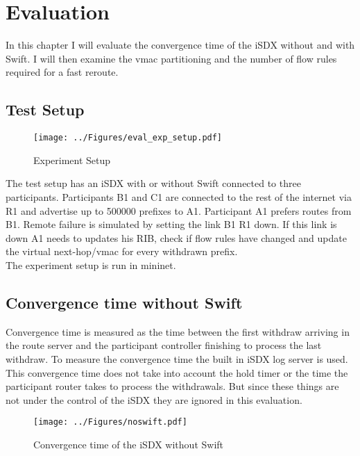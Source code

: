 \chapter{\label{chapter 4}Evaluation}

In this chapter I will evaluate the convergence time of the iSDX without and with Swift.
I will then examine the vmac partitioning and the number of flow rules required for a fast reroute.

\section{\label{chapter4:Test Setup}Test Setup}

\begin{figure}[h]
\center
\texttt{[image: ../Figures/eval\_exp\_setup.pdf]}
\caption{Experiment Setup}
\end{figure}

The test setup has an iSDX with or without Swift connected to three participants. Participants B1 and C1 are connected to the rest of the internet via R1 and advertise up to 500000 prefixes to A1. Participant A1 prefers routes from B1. Remote failure is simulated by setting the link B1 R1 down. If this link is down A1 needs to updates his RIB, check if flow rules have changed and update the virtual next-hop/vmac for every withdrawn prefix.\\ 
The experiment setup is run in mininet. 



\section{\label{chapter4:Convergence time without Swift}Convergence time without Swift}

Convergence time is measured as the time between the first withdraw arriving in the route server and the participant controller finishing to process the last withdraw. To measure the convergence time the built in iSDX log server is used.\\
This convergence time does not take into account the hold timer or the time the participant router takes to process the withdrawals. But since these things are not under the control of the iSDX they are ignored in this evaluation.

\begin{figure}[h]
\center
\texttt{[image: ../Figures/noswift.pdf]}
\caption{Convergence time of the iSDX without Swift}
\end{figure}

